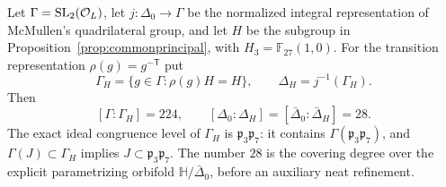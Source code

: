 \begin{proposition}\label{prop:principalstabilizer}
Let $\Gamma=\mathrm{SL}_2(\mathcal O_L)$, let $j:\Delta_0\to\Gamma$ be the
normalized integral representation of McMullen's quadrilateral group, and
let $H$ be the subgroup in Proposition~\ref{prop:commonprincipal}, with
$H_3=\mathbb F_{27}(1,0)$. For the transition representation
$\rho(g)=g^{-\mathsf T}$ put
\[
 \Gamma_H=\{g\in\Gamma:\rho(g)H=H\},
 \qquad \Delta_H=j^{-1}(\Gamma_H).
\]
Then
\[
 [\Gamma:\Gamma_H]=224,\qquad
 [\Delta_0:\Delta_H]=[\bar\Delta_0:\bar\Delta_H]=28.
\]
The exact ideal congruence level of $\Gamma_H$ is
$\mathfrak p_3\mathfrak p_7$: it contains $\Gamma(\mathfrak p_3\mathfrak p_7)$,
and $\Gamma(J)\subset\Gamma_H$ implies $J\subset\mathfrak p_3\mathfrak p_7$.
The number $28$ is the covering degree over the explicit parametrizing
orbifold $\mathbb H/\bar\Delta_0$, before an auxiliary neat refinement.
\end{proposition}
